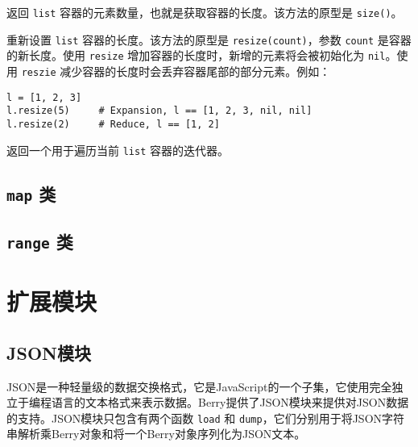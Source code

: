 
返回 \texttt{list} 容器的元素数量，也就是获取容器的长度。该方法的原型是 \texttt{size()}。


重新设置 \texttt{list} 容器的长度。该方法的原型是 \texttt{resize(count)}，参数 \texttt{count} 是容器的新长度。使用 \texttt{resize} 增加容器的长度时，新增的元素将会被初始化为 \texttt{nil}。使用 \texttt{reszie} 减少容器的长度时会丢弃容器尾部的部分元素。例如：
\begin{lstlisting}[language=berry, numbers=none]
l = [1, 2, 3]
l.resize(5)     # Expansion, l == [1, 2, 3, nil, nil]
l.resize(2)     # Reduce, l == [1, 2]
\end{lstlisting}


返回一个用于遍历当前 \texttt{list} 容器的迭代器。

\subsection{\texttt{map} 类}

\subsection{\texttt{range} 类}

\section{扩展模块}
\subsection{JSON模块}

JSON是一种轻量级的数据交换格式，它是JavaScript的一个子集，它使用完全独立于编程语言的文本格式来表示数据。Berry提供了JSON模块来提供对JSON数据的支持。JSON模块只包含有两个函数 \texttt{load} 和 \texttt{dump}，它们分别用于将JSON字符串解析乘Berry对象和将一个Berry对象序列化为JSON文本。


